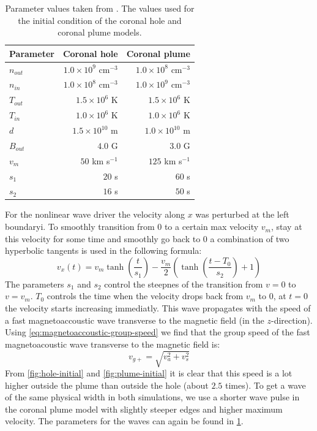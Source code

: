 \begin{table}[H]
	\centering
	\begin{tabular}{|l|r|r|}
		\toprule
		Parameter & Coronal hole & Coronal plume\\
		\midrule
		$n_{out}$ & $1.0\times 10^9$ cm$^{-3}$ & $1.0\times 10^8$ cm$^{-3}$\\
		$n_{in}$ & $1.0\times 10^8$ cm$^{-3}$ & $1.0\times 10^9$ cm$^{-3}$\\
		$T_{out}$ & $1.5\times 10^6$ K & $1.5\times 10^6$ K\\
		$T_{in}$ & $1.0\times10^6$ K & $1.0\times10^6$ K\\
		$d$ & $1.5\times10^{10}$ m& $1.0\times10^{10}$ m \\
		$B_{out} $ & $4.0$ G & $3.0$ G\\
		\midrule
		$v_m$ & $50$ km s$^{-1}$ & $125$ km s$^{-1}$ \\
		$s_1$ & $20$ s & $60$ s \\
		$s_2$ & $16$ s& $50$ s\\
		\bottomrule
	\end{tabular}
	\caption{Parameter values taken from \cite{coronal-hole}. The values used for the initial condition of the coronal hole and coronal plume models.}
	\label{tab:parameters-hole}
\end{table}
For the nonlinear wave driver the velocity along $x$ was perturbed at the left boundaryi. 
To smoothly transition from $0$ to a certain max velocity $v_m$, stay at this velocity for some time and smoothly go back to $0$ a combination of two hyperbolic tangents is used in the following formula:
\begin{equation}
	v_x(t) = v_m \tanh \left( \frac{t}{s_1} \right) - \frac{v_m}{2} \left( \tanh \left( \frac{t-T_0}{s_2} \right) +1 \right) 
\end{equation}
The parameters $s_1$ and $s_2$ control the steepnes of the transition from $v=0$ to $v=v_m$.
$T_0$ controls the time when the velocity drops back from $v_m$ to $0$, at $t=0$ the velocity starts increasing immediatly.
This wave propagates with the speed of a fast magnetoaccoustic wave transverse to the magnetic field (in the $z$-direction).
Using \cref{eq:magnetoaccoustic-group-speed} we find that the group speed of the fast magnetoacoustic wave transverse to the magnetic field is:
\begin{equation*}
	v_{g+} = \sqrt{v_a^2+v_s^2}
\end{equation*}
From \cref{fig:hole-initial} and \cref{fig:plume-initial} it is clear that this speed is a lot higher outside the plume than outside the hole (about $2.5$ times).
To get a wave of the same physical width in both simulations, we use a shorter wave pulse in the coronal plume model with slightly steeper edges and higher maximum velocity.
The parameters for the waves can again be found in \cref{tab:parameters-hole}.

